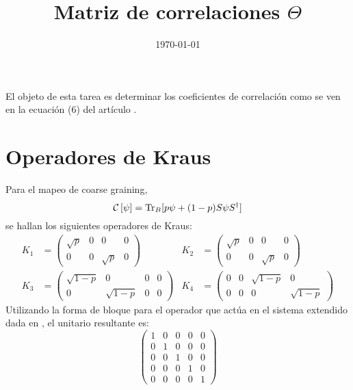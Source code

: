 \documentclass[onecolumn,11pt]{article}
\title{Matriz de correlaciones $\Theta$}
\date{\today}
\newcommand{\mcC}{\mathcal{C}}
\newcommand{\CG}[1]{\mcC\left[#1\right]}
\begin{document}
\maketitle
\thispagestyle{empty}
El objeto de esta tarea es determinar los coeficientes de correlación como se ven en la ecuación (6) del artículo \cite{CGEmergingDynamics}.

\section{Operadores de Kraus}

Para el mapeo de coarse graining,
\begin{equation}
\CG{\psi}=\Tr_{B}[p\psi+(1-p)S\psi S^{\dag}]
\end{equation}
se hallan los siguientes operadores de Kraus:
\begin{align}
    K_{1}&=\begin{pmatrix} \sqrt{p}&0&0&0\\0&0&\sqrt{p}&0\end{pmatrix} & K_{2}&=\begin{pmatrix} \sqrt{p}&0&0&0\\0&0&\sqrt{p}&0\end{pmatrix} \\ K_{3}&=\begin{pmatrix} \sqrt{1-p}&0&0&0\\0&\sqrt{1-p}&0&0\end{pmatrix} & K_{4}&=\begin{pmatrix} 0&0&\sqrt{1-p}&0\\0&0&0&\sqrt{1-p}\end{pmatrix}
\end{align}
Utilizando la forma de bloque para el operador que actúa en el sistema extendido dada en \cite{Chuang}, el unitario resultante es:
\begin{equation}
\begin{pmatrix}1&0&0&0&0\\0&1&0&0&0\\0&0&1&0&0\\0&0&0&1&0\\0&0&0&0&1\end{pmatrix}
\end{equation}


\end{document}

